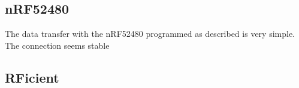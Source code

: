 \subsection{nRF52480}
The data transfer with the nRF52480 programmed as described is very simple.
The connection seems stable


\subsection{RFicient}
